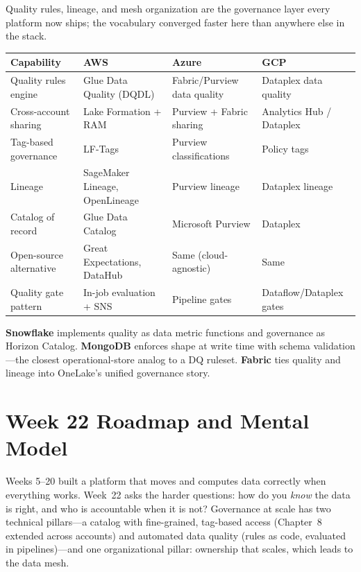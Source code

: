 \begin{crosscloud}
Quality rules, lineage, and mesh organization are the governance layer every platform now ships; the vocabulary converged faster here than anywhere else in the stack.

\vspace{2mm}
{\footnotesize
\begin{tabular}{@{}p{2.8cm}p{3.0cm}p{3.0cm}p{3.0cm}@{}}
\toprule
\textbf{Capability} & \textbf{AWS} & \textbf{Azure} & \textbf{GCP} \\
\midrule
Quality rules engine & Glue Data Quality (DQDL) & Fabric/Purview data quality & Dataplex data quality \\
Cross-account sharing & Lake Formation + RAM & Purview + Fabric sharing & Analytics Hub / Dataplex \\
Tag-based governance & LF-Tags & Purview classifications & Policy tags \\
Lineage & SageMaker Lineage, OpenLineage & Purview lineage & Dataplex lineage \\
Catalog of record & Glue Data Catalog & Microsoft Purview & Dataplex \\
\addlinespace
Open-source alternative & Great Expectations, DataHub & Same (cloud-agnostic) & Same \\
Quality gate pattern & In-job evaluation + SNS & Pipeline gates & Dataflow/Dataplex gates \\
\bottomrule
\end{tabular}}

\vspace{1mm}
\textbf{Snowflake} implements quality as data metric functions and governance as Horizon Catalog. \textbf{MongoDB} enforces shape at write time with schema validation---the closest operational-store analog to a DQ ruleset. \textbf{Fabric} ties quality and lineage into OneLake's unified governance story.
\end{crosscloud}

\section{Week 22 Roadmap and Mental Model}
Weeks 5--20 built a platform that moves and computes data correctly when everything works. Week~22 asks the harder questions: how do you \emph{know} the data is right, and who is accountable when it is not? Governance at scale has two technical pillars---a catalog with fine-grained, tag-based access (Chapter~8 extended across accounts) and automated data quality (rules as code, evaluated in pipelines)---and one organizational pillar: ownership that scales, which leads to the data mesh.

